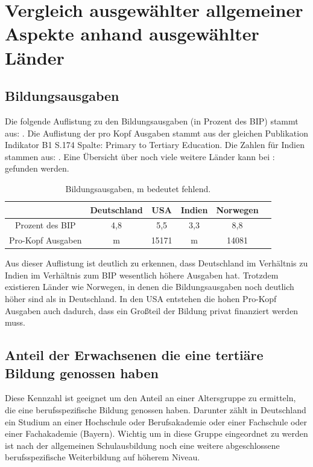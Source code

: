 \section{Vergleich ausgewählter allgemeiner Aspekte anhand ausgewählter Länder}

\subsection*{Bildungsausgaben}
Die folgende Auflistung zu den Bildungsausgaben (in Prozent des BIP) stammt aus: \cite[Indikator B4. S.219]{oecd5}. 
Die Auflistung der pro Kopf Ausgaben stammt aus der gleichen Publikation Indikator B1 S.174 Spalte: Primary to Tertiary Education.
Die Zahlen für Indien stammen aus: \cite[2]{oester}. Eine Übersicht über noch viele weitere Länder kann bei : \cite[165]{hdr} gefunden werden.

\begin{table}[htp]
\begin{tabular}{|c|c|c|c|c|c|}
\hline  	& Deutschland & USA & Indien  & Norwegen \\ 
\hline 	Prozent des BIP &4,8 & 5,5  & 3,3  & 8,8 \\ 
\hline  Pro-Kopf Ausgaben & m & 15171 & m & 14081 \\ 
\hline 
\end{tabular} 
\caption{Bildungsausgaben, m bedeutet fehlend.}
\end{table}
Aus dieser Auflistung ist deutlich zu erkennen, dass Deutschland im Verhältnis zu Indien im Verhältnis zum BIP wesentlich höhere Ausgaben hat. Trotzdem existieren Länder wie Norwegen, in denen die Bildungsausgaben noch deutlich höher sind als in Deutschland. In den USA entstehen die hohen Pro-Kopf Ausgaben auch dadurch, dass ein Großteil der Bildung privat finanziert werden muss.

\subsection*{Anteil der Erwachsenen die eine tertiäre Bildung genossen haben}
Diese Kennzahl ist geeignet um den Anteil an einer Altersgruppe zu ermitteln, die eine berufsspezifische Bildung genossen haben. Darunter zählt in Deutschland ein Studium an einer Hochschule oder Berufsakademie oder einer Fachschule oder einer Fachakademie (Bayern). Wichtig um in diese Gruppe eingeordnet zu werden ist nach der allgemeinen Schulausbildung noch eine weitere abgeschlossene berufsspezifische Weiterbildung auf höherem Niveau.

